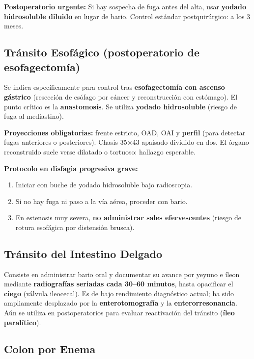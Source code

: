 \textbf{Postoperatorio urgente:} Si hay sospecha de fuga antes del alta, usar \textbf{yodado hidrosoluble diluido} en lugar de bario. Control estándar postquirúrgico: a los 3 meses.

\clearpage
\subsection*{Tránsito Esofágico (postoperatorio de esofagectomía)}

Se indica específicamente para control tras \textbf{esofagectomía con ascenso gástrico} (resección de esófago por cáncer y reconstrucción con estómago). El punto crítico es la \textbf{anastomosis}. Se utiliza \textbf{yodado hidrosoluble} (riesgo de fuga al mediastino).

\textbf{Proyecciones obligatorias:} frente estricto, OAD, OAI y \textbf{perfil} (para detectar fugas anteriores o posteriores). Chasis 35$\times$43 apaisado dividido en dos. El órgano reconstruido suele verse dilatado o tortuoso: hallazgo esperable.

\textbf{Protocolo en disfagia progresiva grave:}
\begin{enumerate}[noitemsep]
	\item Iniciar con buche de yodado hidrosoluble bajo radioscopia.
	\item Si no hay fuga ni paso a la vía aérea, proceder con bario.
	\item En estenosis muy severa, \textbf{no administrar sales efervescentes} (riesgo de rotura esofágica por distensión brusca).
\end{enumerate}

\subsection*{Tránsito del Intestino Delgado}

Consiste en administrar bario oral y documentar su avance por yeyuno e íleon mediante \textbf{radiografías seriadas cada 30--60 minutos}, hasta opacificar el \textbf{ciego} (válvula ileocecal). Es de bajo rendimiento diagnóstico actual; ha sido ampliamente desplazado por la \textbf{enterotomografía} y la \textbf{enterorresonancia}. Aún se utiliza en postoperatorios para evaluar reactivación del tránsito (\textbf{íleo paralítico}).

\subsection*{Colon por Enema}

